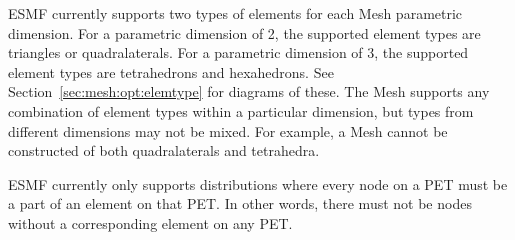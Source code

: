ESMF currently supports two types of elements for each Mesh parametric dimension. For a 
parametric dimension of 2, the supported element types are triangles or quadralaterals. For 
a parametric dimension of 3, the supported element types are tetrahedrons
and hexahedrons. See Section~\ref{sec:mesh:opt:elemtype} for diagrams of these. The Mesh 
supports any combination of element types within a particular dimension, but types from 
different dimensions may not be mixed.  For example, a Mesh cannot be constructed of both 
quadralaterals and tetrahedra.

ESMF currently only supports distributions where every node on a PET must be a part of an 
element on that PET. In other words, there must not be nodes without a corresponding element 
on any PET.
